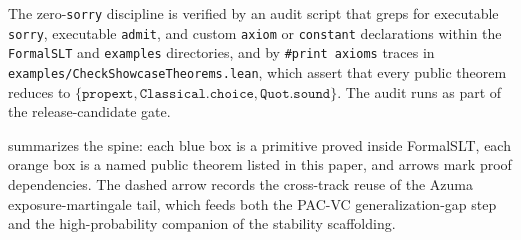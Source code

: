 \documentclass[sigplan,anonymous,review,screen]{acmart}
\begin{document}
The zero-\texttt{sorry} discipline is verified by an audit script that
greps for executable \texttt{sorry}, executable \texttt{admit}, and
custom \texttt{axiom} or \texttt{constant} declarations within the
\texttt{FormalSLT} and \texttt{examples} directories, and by
\texttt{\#print axioms} traces in
\texttt{examples/CheckShowcaseTheorems.lean}, which assert that every
public theorem reduces to $\{\texttt{propext},
\texttt{Classical.choice}, \texttt{Quot.sound}\}$. The audit runs as
part of the release-candidate gate.

 summarizes the spine: each blue box is a primitive
proved inside FormalSLT, each orange box is a named public theorem
listed in this paper, and arrows mark proof dependencies. The dashed
arrow records the cross-track reuse of the Azuma exposure-martingale
tail, which feeds both the PAC-VC generalization-gap step and the
high-probability companion of the stability scaffolding.
\end{document}
